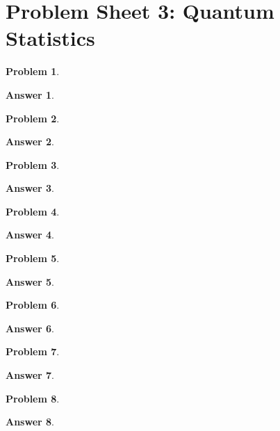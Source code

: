\documentclass[a4paper]{article}
\newtheorem{ans}{Answer}[section]
\theoremstyle{new}
\newtheorem{qns}{Problem}[section]
\begin{document}
\section{Problem Sheet 3: Quantum Statistics}
\begin{qns}

\end{qns}
\begin{ans}

\end{ans}
\begin{qns}

\end{qns}
\begin{ans}

\end{ans}
\newpage
\begin{qns}

\end{qns}
\begin{ans}

\end{ans}
\begin{qns}

\end{qns}
\begin{ans}

\end{ans}
\newpage
\begin{qns}

\end{qns}
\begin{ans}

\end{ans}
\begin{qns}

\end{qns}
\begin{ans}

\end{ans}
\newpage
\begin{qns}

\end{qns}
\begin{ans}

\end{ans}
\begin{qns}

\end{qns}
\begin{ans}

\end{ans}

\newpage
\end{document}
